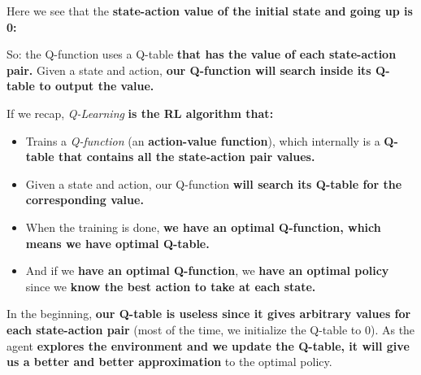 \documentclass[11pt,a4paper]{article}
\begin{document}
Here we see that the \textbf{state-action value of the initial state and going up is 0:}


So: the Q-function uses a Q-table \textbf{that has the value of each state-action pair.} Given a state and action, \textbf{our Q-function will search inside its Q-table to output the value.}


If we recap, \emph{Q-Learning} \textbf{is the RL algorithm that:}

\begin{itemize}
\tightlist
\item
  Trains a \emph{Q-function} (an \textbf{action-value function}), which internally is a \textbf{Q-table that contains all the state-action pair values.}
\item
  Given a state and action, our Q-function \textbf{will search its Q-table for the corresponding value.}
\item
  When the training is done, \textbf{we have an optimal Q-function, which means we have optimal Q-table.}
\item
  And if we \textbf{have an optimal Q-function}, we \textbf{have an optimal policy} since we \textbf{know the best action to take at each state.}
\end{itemize}


In the beginning, \textbf{our Q-table is useless since it gives arbitrary values for each state-action pair} (most of the time, we initialize the Q-table to 0). As the agent \textbf{explores the environment and we update the Q-table, it will give us a better and better approximation} to the optimal policy.

\end{document}
